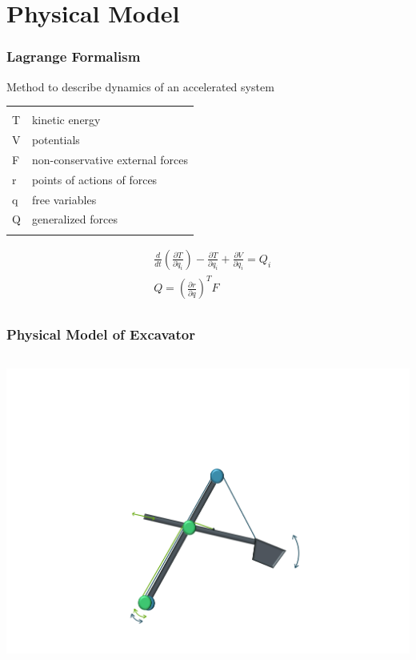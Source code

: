 \section{Physical Model}

\begin{frame}
	\frametitle{Lagrange Formalism}
	
	Method to describe dynamics of an accelerated system\\
	\begin{small}
	\begin{tabular}{ll}
		 & \\
		T & kinetic energy\\
		V & potentials\\
		F & non-conservative external forces\\
		r & points of actions of forces\\ %
		q & free variables\\
		Q & generalized forces\\ \\
	\end{tabular}
	\end{small}
	\begin{align*}
	&\frac{d}{dt}\left(\frac{\partial T}{\partial \dot{q}_i}\right) -
	\frac{\partial T}{\partial q_i} +
	\frac{\partial V}{\partial q_i}
	= Q_i \\
	& Q = \left(\frac{\partial r}{\partial q}\right)^T F\\
	\end{align*}
		
\end{frame}	

\begin{frame}
	\frametitle{Physical Model of Excavator}
	
	
	\begin{columns}
			\centering
			\includegraphics[trim=25cm 5cm 35cm 23cm, clip=true, width=\linewidth]{img/Excavator_Only}
	\end{columns}
	
\end{frame}

